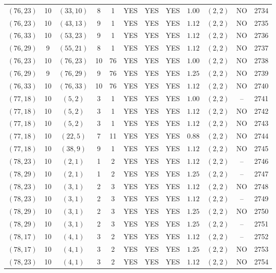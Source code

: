 \begin{longtable}{|c|c|c|c|c|c|c|c|c|c|c|c|}
$(76,23)$ & 10 & $(33,10)$ & 8 & 1 & YES & YES & YES & $1.00$ & $(2,2)$ & NO & 2734\\
$(76,23)$ & 10 & $(43,13)$ & 9 & 1 & YES & YES & YES & $1.12$ & $(2,2)$ & NO & 2735\\
$(76,33)$ & 10 & $(53,23)$ & 9 & 1 & YES & YES & YES & $1.12$ & $(2,2)$ & NO & 2736\\
$(76,29)$ & 9 & $(55,21)$ & 8 & 1 & YES & YES & YES & $1.12$ & $(2,2)$ & NO & 2737\\
$(76,23)$ & 10 & $(76,23)$ & 10 & 76 & YES & YES & YES & $1.00$ & $(2,2)$ & NO & 2738\\
$(76,29)$ & 9 & $(76,29)$ & 9 & 76 & YES & YES & YES & $1.25$ & $(2,2)$ & NO & 2739\\
$(76,33)$ & 10 & $(76,33)$ & 10 & 76 & YES & YES & YES & $1.12$ & $(2,2)$ & NO & 2740\\
$(77,18)$ & 10 & $(5,2)$ & 3 & 1 & YES & YES & YES & $1.00$ & $(2,2)$ & -- & 2741\\
$(77,18)$ & 10 & $(5,2)$ & 3 & 1 & YES & YES & YES & $1.12$ & $(2,2)$ & NO & 2742\\
$(77,18)$ & 10 & $(5,2)$ & 3 & 1 & YES & YES & YES & $1.12$ & $(2,2)$ & NO & 2743\\
$(77,18)$ & 10 & $(22,5)$ & 7 & 11 & YES & YES & YES & $0.88$ & $(2,2)$ & NO & 2744\\
$(77,18)$ & 10 & $(38,9)$ & 9 & 1 & YES & YES & YES & $1.12$ & $(2,2)$ & NO & 2745\\
$(78,23)$ & 10 & $(2,1)$ & 1 & 2 & YES & YES & YES & $1.12$ & $(2,2)$ & -- & 2746\\
$(78,29)$ & 10 & $(2,1)$ & 1 & 2 & YES & YES & YES & $1.25$ & $(2,2)$ & -- & 2747\\
$(78,23)$ & 10 & $(3,1)$ & 2 & 3 & YES & YES & YES & $1.12$ & $(2,2)$ & NO & 2748\\
$(78,23)$ & 10 & $(3,1)$ & 2 & 3 & YES & YES & YES & $1.12$ & $(2,2)$ & -- & 2749\\
$(78,29)$ & 10 & $(3,1)$ & 2 & 3 & YES & YES & YES & $1.25$ & $(2,2)$ & NO & 2750\\
$(78,29)$ & 10 & $(3,1)$ & 2 & 3 & YES & YES & YES & $1.25$ & $(2,2)$ & -- & 2751\\
$(78,17)$ & 10 & $(4,1)$ & 3 & 2 & YES & YES & YES & $1.12$ & $(2,2)$ & -- & 2752\\
$(78,17)$ & 10 & $(4,1)$ & 3 & 2 & YES & YES & YES & $1.25$ & $(2,2)$ & NO & 2753\\
$(78,23)$ & 10 & $(4,1)$ & 3 & 2 & YES & YES & YES & $1.12$ & $(2,2)$ & NO & 2754\\

\end{longtable}
